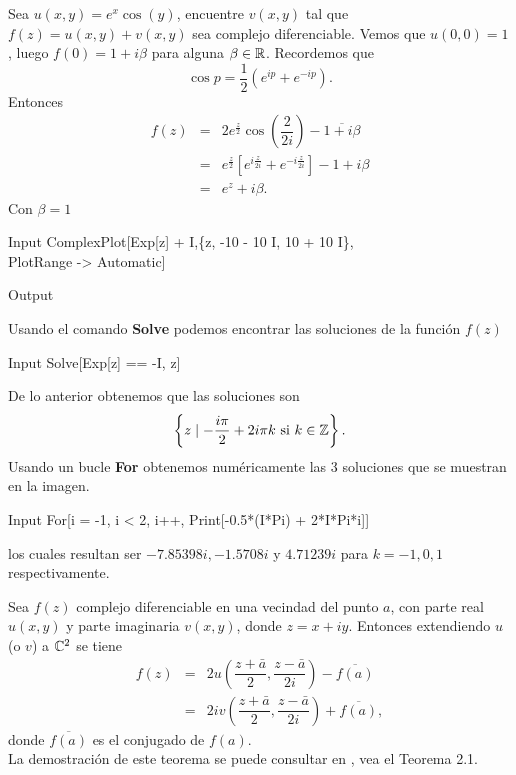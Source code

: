\begin{Ejem}	
	Sea $u(x,y)=e^{x} \cos(y)$, encuentre $v(x,y)$ tal que $f(z)=u(x,y)+v(x,y)$ sea complejo diferenciable.
	\solu
	Vemos que $u(0,0)=1$, luego $f(0)=1+i\beta$ para  alguna $\beta\in\mathbb{R}$. Recordemos que 
	$$\cos p=\dfrac{1}{2}(e^{ip}+e^{-ip}).$$
	Entonces 
	\[
		\begin{array}{ccl}
			f(z)&=&2e^{\frac{z}{2}}\cos\left(\dfrac{2}{2i}\right)-\overline{1+i\beta}\\
			&=&e^{\frac{z}{2}}\left[e^{i\frac{z}{2i}}+e^{-i\frac{z}{2i}} \right]-1+i\beta\\
			&=&e^{z}+i\beta.
		\end{array}
	\]
	Con $\beta=1$
	
	\begin{mmaCell}{Input}
		ComplexPlot[Exp[z] + I,\{z, -10 - 10 I, 10 + 10 I\},\\PlotRange -> Automatic]
	\end{mmaCell}
	
	\begin{mmaCell}[moregraphics={moreig={scale=.25}}]{Output}
	\end{mmaCell}
Usando el comando \textbf{Solve} podemos encontrar las soluciones  de la función $f(z)$
\begin{mmaCell}{Input}
	 Solve[Exp[z] == -I, z]
\end{mmaCell}
De lo anterior obtenemos que las soluciones son $$\left\{z\mid -\dfrac{i\pi}{2} +2 i \pi  k\text{ si }k\in \mathbb{Z}\right\}.$$
Usando un bucle \textbf{For} obtenemos numéricamente las 3 soluciones que se muestran en la imagen.
\begin{mmaCell}{Input}
	 For[i = -1, i < 2, i++, Print[-0.5*(I*Pi) + 2*I*Pi*i]]
\end{mmaCell}
los cuales resultan ser $-7.85398 i,  -1.5708 i$ y $4.71239i$ para $k=-1,0,1$ respectivamente.\endproof

\end{Ejem}


\begin{teor}\label{TAS2}
	Sea $f(z)$ complejo diferenciable en una vecindad del punto $a$, con parte real $u(x, y)$ y parte imaginaria $v(x, y)$, donde 
	$z = x + iy$. Entonces extendiendo  $u$ (o $v$) a $\mathbb{C}^2$ se tiene
	\[
	\begin{array}{ccl}
		f(z)&=&2u\left(\dfrac{z+\bar{a}}{2},\dfrac{z-\bar{a}}{2i}\right)-\overline{f(a)}\\
		&=&2iv\left(\dfrac{z+\bar{a}}{2},\dfrac{z-\bar{a}}{2i}\right)+\overline{f(a)},
	\end{array}
	\]
	donde $\overline{f(a)}$ es el conjugado de $f(a)$.\\
		La demostración de este teorema se puede consultar en \cite{Shaw-A}, vea el Teorema 2.1.
\end{teor}


